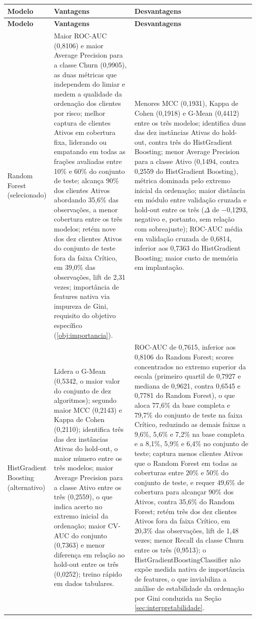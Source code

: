 \begin{longtable}{|>{\raggedright\arraybackslash}p{2.3cm}|>{\raggedright\arraybackslash}p{5.6cm}|>{\raggedright\arraybackslash}p{5.6cm}|}
\hline
\textbf{Modelo} & \textbf{Vantagens} & \textbf{Desvantagens} \\
\hline
\endfirsthead
\hline
\textbf{Modelo} & \textbf{Vantagens} & \textbf{Desvantagens} \\
\hline
\endhead
\hline
\endfoot
\hline
\endlastfoot
Random Forest (selecionado) &
Maior ROC-AUC (0,8106) e maior Average Precision para a classe Churn (0,9905), as duas métricas que independem do limiar e medem a qualidade da ordenação dos clientes por risco; melhor captura de clientes Ativos em cobertura fixa, liderando ou empatando em todas as frações avaliadas entre 10\% e 60\% do conjunto de teste; alcança 90\% dos clientes Ativos abordando 35,6\% das observações, a menor cobertura entre os três modelos; retém nove dos dez clientes Ativos do conjunto de teste fora da faixa Crítico, em 39,0\% das observações, lift de 2,31 vezes; importância de features nativa via impureza de Gini, requisito do objetivo específico (\ref{obj:importancia}). &
Menores MCC (0,1931), Kappa de Cohen (0,1918) e G-Mean (0,4412) entre os três modelos; identifica duas das dez instâncias Ativas do hold-out, contra três do HistGradient Boosting; menor Average Precision para a classe Ativo (0,1494, contra 0,2559 do HistGradient Boosting), métrica dominada pelo extremo inicial da ordenação; maior distância em módulo entre validação cruzada e hold-out entre os três ($\Delta$ de $-$0,1293, negativo e, portanto, sem relação com sobreajuste); ROC-AUC média em validação cruzada de 0,6814, inferior aos 0,7363 do HistGradient Boosting; maior custo de memória em implantação. \\
\hline
HistGradient Boosting (alternativo) &
Lidera o G-Mean (0,5342, o maior valor do conjunto de dez algoritmos); segundo maior MCC (0,2143) e Kappa de Cohen (0,2110); identifica três das dez instâncias Ativas do hold-out, o maior número entre os três modelos; maior Average Precision para a classe Ativo entre os três (0,2559), o que indica acerto no extremo inicial da ordenação; maior CV-AUC do conjunto (0,7363) e menor diferença em relação ao hold-out entre os três (0,0252); treino rápido em dados tabulares. &
ROC-AUC de 0,7615, inferior aos 0,8106 do Random Forest; scores concentrados no extremo superior da escala (primeiro quartil de 0,7927 e mediana de 0,9621, contra 0,6545 e 0,7781 do Random Forest), o que aloca 77,6\% da base completa e 79,7\% do conjunto de teste na faixa Crítico, reduzindo as demais faixas a 9,6\%, 5,6\% e 7,2\% na base completa e a 8,1\%, 5,9\% e 6,4\% no conjunto de teste; captura menos clientes Ativos que o Random Forest em todas as coberturas entre 20\% e 50\% do conjunto de teste, e requer 49,6\% de cobertura para alcançar 90\% dos Ativos, contra 35,6\% do Random Forest; retém três dos dez clientes Ativos fora da faixa Crítico, em 20,3\% das observações, lift de 1,48 vezes; menor Recall da classe Churn entre os três (0,9513); o HistGradientBoostingClassifier não expõe medida nativa de importância de features, o que inviabiliza a análise de estabilidade da ordenação por Gini conduzida na Seção \ref{sec:interpretabilidade}. \\

\end{longtable}
